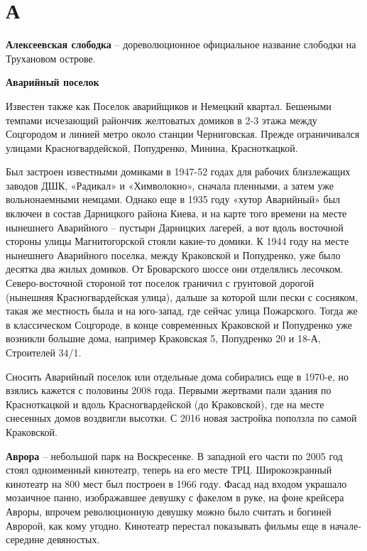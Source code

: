 \chapter*{А}

\textbf{Алексеевская слободка} –  дореволюционное официальное название слободки на Трухановом острове.\\

\medskip

\textbf{Аварийный поселок}

Известен также как Поселок аварийщиков и Немецкий квартал. Бешеными темпами исчезающий райончик желтоватых домиков в 2-3 этажа между Соцгородом и линией метро около станции Черниговская. Прежде ограничивался улицами Красногвардейской, Попудренко, Минина, Красноткацкой. 

Был застроен известными домиками в 1947-52 годах для рабочих близлежащих заводов ДШК, «Радикал» и «Химволокно», сначала пленными, а затем уже вольнонаемными немцами. Однако еще в 1935 году «хутор Аварийный» был включен в состав Дарницкого района Киева, и на карте того времени на месте нынешнего Аварийного – пустыри Дарницких лагерей, а вот вдоль восточной стороны улицы Магнитогорской стояли какие-то домики. К 1944 году на месте нынешнего Аварийного поселка, между Краковской и Попудренко, уже было десятка два жилых домиков. От Броварского шоссе они отделялись лесочком. Северо-восточной стороной тот поселок граничил с грунтовой дорогой (нынешняя Красногвардейская улица), дальше за которой шли пески с сосняком, такая же местность была и на юго-запад, где сейчас улица Пожарского. Тогда же в классическом Соцгороде, в конце современных Краковской и Попудренко уже возникли большие дома, например Краковская 5, Попудренко 20 и 18-А, Строителей 34/1.

Сносить Аварийный поселок или отдельные дома собирались еще в 1970-е, но взялись кажется с половины 2008 года. Первыми жертвами пали здания по Красноткацкой и вдоль Красногвардейской (до Краковской), где на месте снесенных домов воздвигли высотки. С 2016 новая застройка поползла по самой Краковской.\\

\medskip

\textbf{Аврора} – небольшой парк на Воскресенке. В западной его части по 2005 год стоял одноименный кинотеатр, теперь на его месте ТРЦ. Широкоэкранный кинотеатр на 800 мест был построен в 1966 году. Фасад над входом украшало мозаичное панно, изображавшее девушку с факелом в руке, на фоне крейсера Авроры, впрочем революционную девушку можно было считать и богиней Авророй, как кому угодно. Кинотеатр перестал показывать фильмы еще в начале-середине девяностых.

